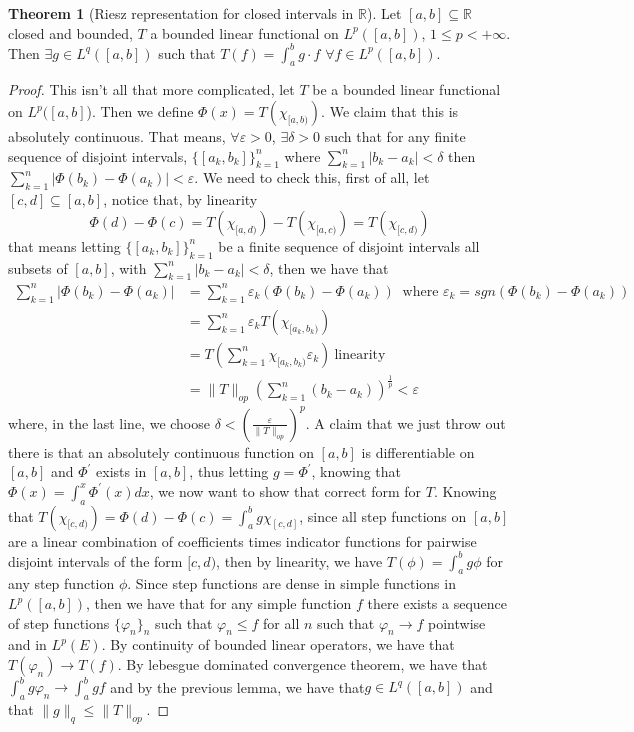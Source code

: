 \documentclass[12pt]{article}
\theoremstyle{definition}
\newtheorem{theorem}{Theorem}[section]
\begin{document}
	\begin{theorem}[Riesz representation for closed intervals in $\mathbb{R}$]
		Let $[a,b] \subseteq \mathbb{R}$ closed and bounded, $T$ a bounded linear functional on $L^p([a,b])$, $1 \leq p < +\infty$. Then $\exists g \in L^q([a,b])$ such that $T(f) = \int_{a}^b g \cdot f $ $\forall f \in L^p([a,b])$.
		
	\end{theorem}
	\begin{proof}
		This isn't all that more complicated, let $T$ be a bounded linear functional on $L^p([a,b]$). Then we define $\Phi(x) = T(\chi_{[a,b)})$. We claim that this is absolutely continuous. That means, $\forall \varepsilon > 0$, $\exists \delta > 0$ such that for any finite sequence of disjoint intervals, $\{[a_k,b_k]\}_{k=1}^n$ where $\sum_{k=1}^n |b_k-a_k| < \delta$ then $\sum_{k=1}^n |\Phi(b_k) - \Phi(a_k)| < \varepsilon$. We need to check this, first of all, let $[c,d] \subseteq [a,b]$, notice that, by linearity
		$$ \Phi(d) - \Phi(c)  = T(\chi_{[a,d)}) - T(\chi_{[a,c)}) = T(\chi_{[c,d)})$$
			that means letting $\{[a_k,b_k]\}_{k=1}^n$ be a finite sequence of disjoint intervals all subsets of $[a,b]$, with $\sum_{k=1}^n |b_k-a_k| < \delta$, then we have that 
			\begin{align*}\sum_{k=1}^n |\Phi(b_k) - \Phi(a_k)| &= \sum_{k=1}^n \varepsilon_k (\Phi(b_k) - \Phi(a_k))	\ \text{ where $\varepsilon_k = sgn(\Phi(b_k) - \Phi(a_k))$}\\
			&= \sum_{k=1}^n \varepsilon_k T(\chi_{[a_k,b_k)})\\
			&= T\left( \sum_{k=1}^n \chi_{[a_k,b_k)}\varepsilon_k\right) \ \text{linearity}\\
			&= \|T\|_{op} \left(\sum_{k=1}^n (b_k-a_k)\right)^\frac{1}{p} < \varepsilon
			\end{align*}
			where, in the last line, we choose $\displaystyle \delta  < \left(\frac{\varepsilon}{\|T\|_{op}}\right)^{p}$. 
			A claim that we just throw out there is that an absolutely continuous function on $[a,b]$ is differentiable on $[a,b]$  and $\Phi^\prime$ exists in $[a,b]$, thus letting $g = \Phi^\prime$, knowing that $\Phi(x) = \int_a^x \Phi^\prime(x)dx$, we now want to show that correct form for $T$. Knowing that $T(\chi_{[c,d)}) = \Phi(d) - \Phi(c) = \int_a^b g \chi_{[c,d]}$, since all step functions on $[a,b]$ are a linear combination of coefficients times indicator functions for pairwise disjoint intervals of the form $[c,d)$, then by linearity, we  have $T(\phi) = \int_a^b g \phi$ for any step function $\phi$. Since step functions are dense in simple functions in $L^p([a,b])$, then we have that for any simple function $f$ there exists a sequence of step functions $\{\varphi_n\}_n$ such that $\varphi_n \leq f$ for all $n$ such that $\varphi_n \to f$ pointwise and in $L^p(E)$. By continuity of bounded linear operators, we have that $T(\varphi_n) \to T(f)$. By lebesgue dominated convergence theorem, we have that $\int_a^b g \varphi_n \to \int_a^b g f$ and by the previous lemma, we have  that$g \in L^q([a,b])$ and that $\|g\|_q \leq \|T\|_{op}$. 

	\end{proof}
\end{document}
